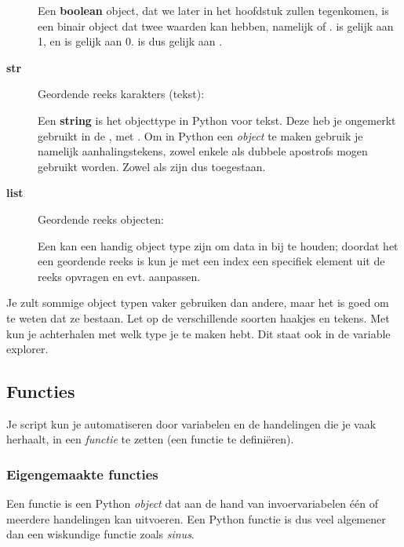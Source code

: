 \documentclass[a4paper,11pt, fleqn]{article}
\begin{document}
\begin{description}
Een {\bf boolean} object, dat we later in het hoofdstuk zullen tegenkomen, is een binair object dat twee waarden kan hebben, namelijk  of .  is gelijk aan 1, en  is gelijk aan 0.  is dus gelijk aan .

\item[\textbf{str}] Geordende reeks karakters (tekst): 

Een {\bf string} is het objecttype in Python voor tekst. Deze heb je ongemerkt gebruikt in de , met . Om in Python een  \textit{object} te maken gebruik je namelijk aanhalingstekens, zowel enkele als dubbele apostrofs mogen gebruikt worden. Zowel  als  zijn dus toegestaan.

\item[\textbf{list}] Geordende reeks objecten: \pythoninline{[10, "hello",200.3]}

Een  kan een handig object type zijn om data in bij te houden; doordat het een geordende reeks is kun je met een index een specifiek element uit de reeks opvragen en evt. aanpassen.

\end{description}

Je zult sommige object typen vaker gebruiken dan andere, maar het is goed om te weten dat ze bestaan. Let op de verschillende soorten haakjes en tekens. Met  kun je achterhalen met welk type je te maken hebt. Dit staat ook in de variable explorer.

\subsection{Functies}
Je script kun je automatiseren door variabelen en de handelingen die je vaak herhaalt, in een \textit{functie} te zetten (een functie te defini\"eren).

\subsubsection{Eigengemaakte functies}
Een functie is een Python \textit{object} dat aan de hand van invoervariabelen \'e\'en of meerdere handelingen kan uitvoeren. Een Python functie is dus veel algemener dan een wiskundige functie zoals \textit{sinus}.  
\end{document}
